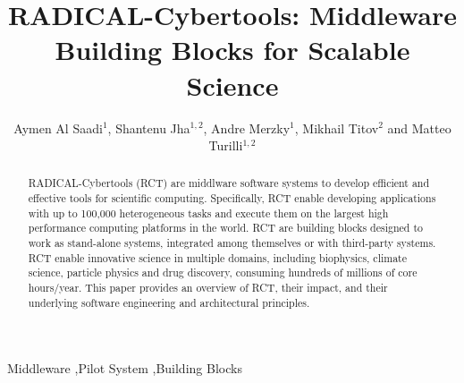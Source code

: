 \documentclass[preprint,12pt, a4paper]{elsarticle}
\begin{document}
\begin{frontmatter}

\title{RADICAL-Cybertools: Middleware Building Blocks for Scalable Science}

\author{Aymen Al Saadi$^1$, Shantenu Jha$^{1,2}$, Andre Merzky$^1$, Mikhail Titov$^2$ and Matteo Turilli$^{1,2}$}
\address{$^1$Electrical \& Computer Engineering, Rutgers University, Piscataway, NJ 08854, USA, $^2$Brookhaven National Laboratory}

\begin{abstract}
RADICAL-Cybertools (RCT) are middlware software systems to develop efficient and
effective tools for scientific computing. Specifically, RCT enable developing
applications with up to 100,000 heterogeneous tasks and execute them on the
largest high performance computing platforms in the world. RCT are building
blocks designed to work as stand-alone systems, integrated among themselves or
with third-party systems. RCT enable innovative science in multiple domains,
including biophysics, climate science, particle physics and drug discovery,
consuming hundreds of millions of core hours/year. This paper provides an
overview of RCT, their impact, and their underlying software engineering and
architectural principles.
\end{abstract}

\begin{keyword}

Middleware \sep Pilot System \sep Building Blocks



\end{keyword}

\end{frontmatter}


\end{document}
